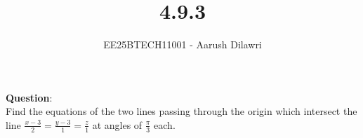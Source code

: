 \documentclass[journal]{IEEEtran}
\begin{document}

\vspace{3cm}

\title{4.9.3}
\author{EE25BTECH11001 - Aarush Dilawri}
\maketitle
{\let\newpage\relax\maketitle}

\renewcommand{\thefigure}{\theenumi}
\renewcommand{\thetable}{\theenumi}
\setlength{\intextsep}{10pt} %


\renewcommand{\thetable}{\theenumi}

\textbf{Question}:\\
Find the equations of the two lines passing through the origin which intersect the line $\frac{x-3}{2} = \frac{y-3}{1} = \frac{z}{1}$ at angles of $\frac{\pi}{3}$ each.
\end{document}
